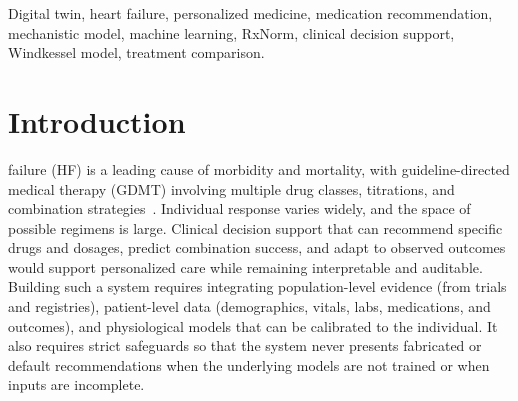 \documentclass[conference]{IEEEtran}
\begin{document}
\begin{abstract}
Heart failure (HF) management requires personalized medication selection from a large space of drugs and combinations, aligned with guidelines and patient-specific physiology. We present the HF-Digital Twin Platform, a hospital-grade system that combines data-driven machine learning with mechanistic cardiovascular models to deliver drug-level recommendations, combination success prediction, and longitudinal patient modeling. The platform integrates a calibrated digital twin (per-patient Windkessel calibration and outcome-based updates), an RxNorm-backed medication database, a clinical document pipeline (OCR, prescription and lab parsing, temporal extraction into a structured patient database), and a production REST API with a professional web frontend. We describe the architecture, implementation, validation strategy, and design choices that avoid mock or placeholder outputs when models are untrained or data are incomplete. The system is evaluated on its modular design, alignment with clinical workflows, and technical complexity spanning ML, mechanistic modeling, and clinical data engineering. The paper provides full technical detail on data schema, API design, model formulation, and safety measures to support reproducibility and deployment in research or pilot clinical settings.
\end{abstract}

\begin{IEEEkeywords}
Digital twin, heart failure, personalized medicine, medication recommendation, mechanistic model, machine learning, RxNorm, clinical decision support, Windkessel model, treatment comparison.
\end{IEEEkeywords}

\section{Introduction}
 failure (HF) is a leading cause of morbidity and mortality, with guideline-directed medical therapy (GDMT) involving multiple drug classes, titrations, and combination strategies~\cite{heidenreich2022aha,mcdonagh2021esc}. Individual response varies widely, and the space of possible regimens is large. Clinical decision support that can recommend specific drugs and dosages, predict combination success, and adapt to observed outcomes would support personalized care while remaining interpretable and auditable. Building such a system requires integrating population-level evidence (from trials and registries), patient-level data (demographics, vitals, labs, medications, and outcomes), and physiological models that can be calibrated to the individual. It also requires strict safeguards so that the system never presents fabricated or default recommendations when the underlying models are not trained or when inputs are incomplete.
\end{document}
